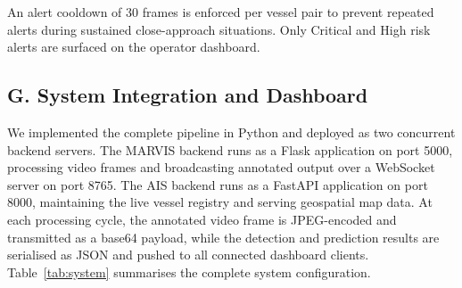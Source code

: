 \documentclass{ieeeaccess}
\begin{document}
An alert cooldown of 30 frames is enforced per vessel pair to prevent 
repeated alerts during sustained close-approach situations. Only 
Critical and High risk alerts are surfaced on the operator dashboard.

\subsection*{G. System Integration and Dashboard}

We implemented the complete pipeline in Python and deployed as two 
concurrent backend servers. The MARVIS backend runs as a Flask 
application on port 5000, processing video frames and broadcasting 
annotated output over a WebSocket server on port 8765. The AIS 
backend runs as a FastAPI application on port 8000, maintaining the 
live vessel registry and serving geospatial map data. At each 
processing cycle, the annotated video frame is JPEG-encoded and 
transmitted as a base64 payload, while the detection and prediction 
results are serialised as JSON and pushed to all connected dashboard 
clients. Table~\ref{tab:system} summarises the complete system 
configuration.
\end{document}
